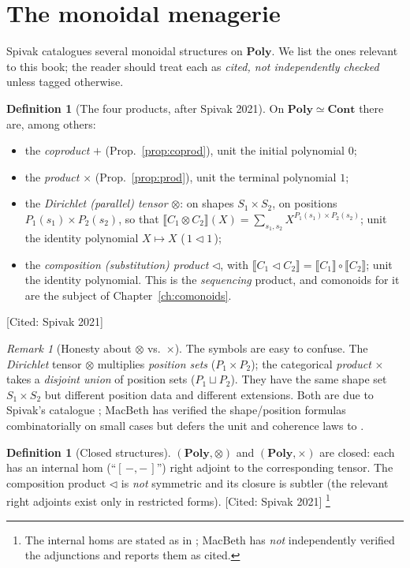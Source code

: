 \documentclass[11pt,a4paper]{book}
\newcommand{\Cont}{\mathbf{Cont}}
\newcommand{\Poly}{\mathbf{Poly}}
\newcommand{\Ext}[1]{\llbracket #1 \rrbracket}
\theoremstyle{plain}
\theoremstyle{definition}
\newtheorem{Definition}[Theorem]{Definition}
\theoremstyle{remark}
\newtheorem{Remark}[Theorem]{Remark}
\newcommand{\prov}[1]{\hfill\textsf{\footnotesize[#1]}}
\begin{document}
\section{The monoidal menagerie}

Spivak \cite{Spivak21} catalogues several monoidal structures on $\Poly$. We list
the ones relevant to this book; the reader should treat each as
\emph{cited, not independently checked} unless tagged otherwise.

\begin{Definition}[The four products, after Spivak 2021]\label{def:menagerie}
On $\Poly\simeq\Cont$ there are, among others:
\begin{itemize}[nosep]
  \item the \emph{coproduct} $+$ (Prop.~\ref{prop:coprod}), unit the initial
        polynomial $0$;
  \item the \emph{product} $\times$ (Prop.~\ref{prop:prod}), unit the terminal
        polynomial $1$;
  \item the \emph{Dirichlet (parallel) tensor} $\otimes$: on shapes
        $S_1\times S_2$, on positions $P_1(s_1)\times P_2(s_2)$, so that
        $\Ext{C_1\otimes C_2}(X)=\sum_{s_1,s_2}X^{P_1(s_1)\times P_2(s_2)}$; unit
        the identity polynomial $X\mapsto X$ (\,$1\triangleleft 1$\,);
  \item the \emph{composition (substitution) product} $\triangleleft$, with
        $\Ext{C_1\triangleleft C_2}=\Ext{C_1}\circ\Ext{C_2}$; unit the identity
        polynomial. This is the \emph{sequencing} product, and comonoids for it
        are the subject of Chapter~\ref{ch:comonoids}.
\end{itemize}
\prov{Cited: Spivak 2021}
\end{Definition}

\begin{Remark}[Honesty about $\otimes$ vs.\ $\times$]
The symbols are easy to confuse. The \emph{Dirichlet} tensor $\otimes$ multiplies
\emph{position sets} ($P_1\times P_2$); the categorical \emph{product} $\times$
takes a \emph{disjoint union} of position sets ($P_1\sqcup P_2$). They have the
same shape set $S_1\times S_2$ but different position data and different
extensions. Both are due to Spivak's catalogue \cite{Spivak21}; MacBeth has
verified the shape/position formulas combinatorially on small cases but defers
the unit and coherence laws to \cite{Spivak21}.
\end{Remark}

\begin{Definition}[Closed structures]\label{def:closed}
$(\Poly,\otimes)$ and $(\Poly,\times)$ are closed: each has an internal hom
(``$[\,-,-\,]$'') right adjoint to the corresponding tensor. The composition
product $\triangleleft$ is \emph{not} symmetric and its closure is subtler (the
relevant right adjoints exist only in restricted forms).
\prov{Cited: Spivak 2021}%
\footnote{The internal homs are stated as in \cite{Spivak21}; MacBeth has
\emph{not} independently verified the adjunctions and reports them as cited.}
\end{Definition}
\end{document}
